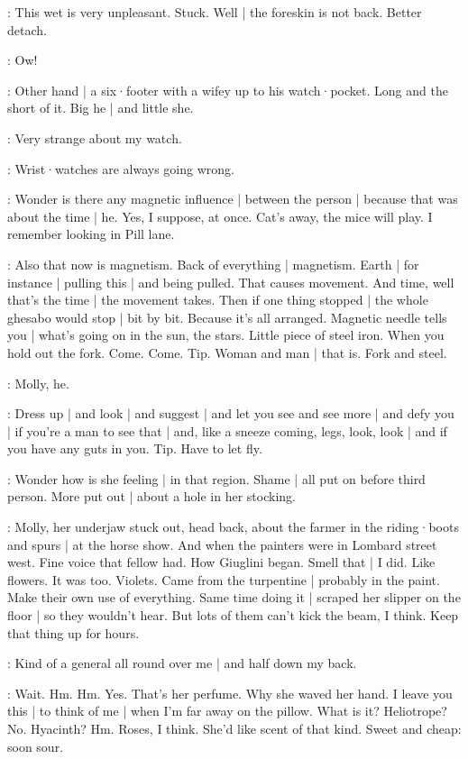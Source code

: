 \BloomCurrent:
This wet is very unpleasant.
Stuck.
Well |
the foreskin is not back.
Better detach.%

\BloomInt:
Ow!

\BloomAbstract:
Other hand |
a six·footer with a wifey up to his watch·pocket.
Long and the short of it.
Big he |
and little she.

\BloomToday:
Very strange about my watch.

\BloomAbstract:
Wrist·watches are always going wrong.

\BloomToday:
Wonder is there any magnetic influence |
between the person |
because that was about the time |
he.
Yes,
I suppose,
at once.
Cat's away,
the mice will play.
I remember looking in Pill lane.

\BloomAbstract:
Also that now is magnetism.
Back of everything |
magnetism.
Earth |
for instance |
pulling this |
and being pulled.
That causes movement.
And time,
well that's the time |
the movement takes.
Then if one thing stopped |
the whole ghesabo would stop |
bit by bit.%
Because it's all arranged.
Magnetic needle tells you |
what's going on in the sun,
the stars.
Little piece of steel iron.
When you hold out the fork.
Come.
Come.
Tip.
Woman and man |
that is.
Fork and steel.

\BloomToday:
Molly,
he.

\BloomAbstract:
Dress up |
and look |
and suggest |
and let you see and see more |
and defy you |
if you're a man to see that |
and,
like a sneeze coming,
legs,
look,
look |
and if you have any guts in you.
Tip.
Have to let fly.

\BloomCurrent:
Wonder how is she feeling |
in that region.
Shame |
all put on before third person.
More put out |
about a hole in her stocking.

\BloomHist:
Molly,
her underjaw stuck out,
head back,
about the farmer in the riding·boots and spurs |
at the horse show.%
And when the painters were in Lombard street west.
Fine voice that fellow had.
How Giuglini began.
Smell that |
I did.
Like flowers.
It was too.
Violets.
Came from the turpentine |
probably in the paint.
Make their own use of everything.
Same time doing it |
scraped her slipper on the floor |
so they wouldn't hear.
But lots of them can't kick the beam,
I think.
Keep that thing up for hours.

\BloomCurrent:
Kind of a general all round over me |
and half down my back.

\BloomCurrent:
Wait.
Hm.
Hm.
Yes.
That's her perfume.
Why she waved her hand.
I leave you this |
to think of me |
when I'm far away on the pillow.
What is it?
Heliotrope?
No.
Hyacinth?
Hm.
Roses,
I think.
She'd like scent of that kind.
Sweet and cheap:
soon sour.%

